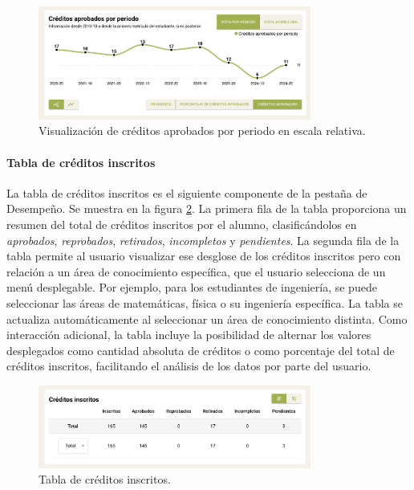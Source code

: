 \begin{enumerate}
	      \begin{figure}[H]
		      \centering
		      \includegraphics[width=0.8\textwidth]{assets/nes/creditos_periodo_relativo.png}
		      \caption{Visualización de créditos aprobados por periodo en escala relativa.}
		      \label{fig:creditos_periodo_relativo}
	      \end{figure}
\end{enumerate}

\paragraph{Tabla de créditos inscritos} La tabla de créditos inscritos es el siguiente componente de la pestaña de Desempeño. Se muestra en la figura \ref{fig:tabla_creditos}. La primera fila de la tabla proporciona un resumen del total de créditos inscritos por el alumno, clasificándolos en \textit{aprobados}, \textit{reprobados}, \textit{retirados}, \textit{incompletos} y \textit{pendientes}. La segunda fila de la tabla permite al usuario visualizar ese desglose de los créditos inscritos pero con relación a un área de conocimiento específica, que el usuario selecciona de un menú desplegable. Por ejemplo, para los estudiantes de ingeniería, se puede seleccionar las áreas de matemáticas, física o su ingeniería específica. La tabla se actualiza automáticamente al seleccionar un área de conocimiento distinta. Como interacción adicional, la tabla incluye la posibilidad de alternar los valores desplegados como  cantidad absoluta de créditos o como porcentaje del total de créditos inscritos, facilitando el análisis de los datos por parte del usuario.

\begin{figure}[H]
	\centering
	\includegraphics[width=0.8\textwidth]{assets/nes/tabla_creditos.png}
	\caption{Tabla de créditos inscritos.}
	\label{fig:tabla_creditos}
\end{figure}

